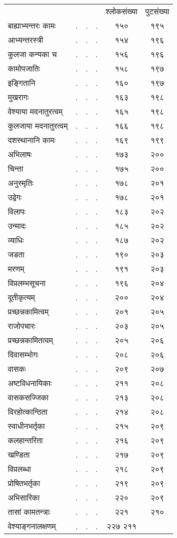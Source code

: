\documentclass[11pt, openany]{book}
\begin{document}
\newpage

\begin{center}
\begin{tabular}{m{10em} m{2em} m{2em} m{2em} c c}
& & & & श्लोकसंख्या & पुटसंख्या\\
बाह्याभ्यन्तरः कामः& .& .& .&१५० &१९५\\
आभ्यन्तरस्त्री& .& .& .&१५४ &१९६\\
कुलजा कन्यका च& .& .& .&१५६ &१९६\\
कामोपजातिः& .& .& .&१५८ &१९७\\
इङ्गितानि& .& .& .&१६० &१९७\\
मुखरागः& .& .& .&१६३ &१९८\\
वेश्याया मदनातुरत्वम्& .& .& .&१६५ &१९८\\
कुलजाया मदनातुरत्वम्& .& .& .&१६६& १९८\\
दशस्थानानि कामः& .& .& .&१६९& १९९\\
अभिलाषः& .& .& .&१७३&२००\\
चिन्ता& .& .& .&१७५& २००\\
अनुस्मृतिः& .& .& .&१७८& २०१\\
उद्वेगः& .& .& .&१७८& २०१\\
विलापः& .& .& .&१८३ &२०२\\
उन्मादः& .& .& .&१८५ &२०२\\
व्याधिः& .& .& .&१८७ &२०२\\
जडता& .& .& .&१९० &२०३\\
मरणम्& .& .& .&१९१ &२०३\\
विप्रलम्भसूचना& .& .& .&१९६ &२०४\\
दूतीकृत्यम्& .& .& .&२०० &२०४\\
प्रच्छन्नकामित्वम्& .& .& .&२०१ &२०५\\
राजोपचारः& .& .& .&२०३ &२०५\\
प्रच्छन्नकामितत्वम्& .& .& .&२०५ &२०६\\
दिवासम्भोगः& .& .& .&२०८ &२०६\\
वासकः& .& .& .&२०९ &२०७\\
अष्टविधनायिकाः& .& .& .&२११ &२०८\\
वासकसज्जिका& .& .& .&२१३ &२०८\\
विरहोत्कान्ठिता& .& .& .&२१४ &२०८\\
स्वाधीनभर्तृका& .& .& .&२१५ &२०९\\
कलहान्तरिता& .& .& .&२१६ &२०९\\
खण्डिता& .& .& .&२१७ &२०९\\
विप्रलब्धा& .& .& .&२१८ &२०९\\
प्रोषितभर्तृका& .& .& .&२१९ &२०९\\
अभिसारिका& .& .& .&२२० &२०९\\
तासां कामतन्त्राः& .& .& .&२२१ &२१०\\
वेश्याङ्गनालक्षणम्& .& .& .&२२७ २११
\end{tabular}
\end{center}
\end{document}
